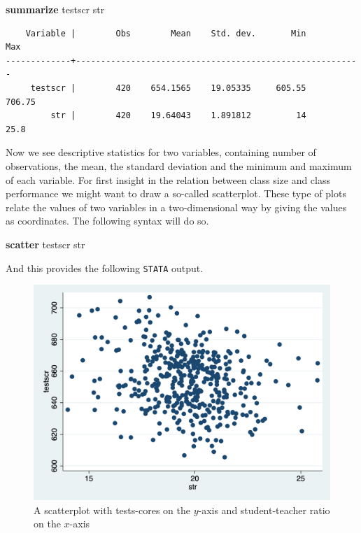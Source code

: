 \documentclass[
]{book}
\newenvironment{Shaded}{\begin{snugshade}}{\end{snugshade}}
\newcommand{\KeywordTok}[1]{\textcolor[rgb]{0.13,0.29,0.53}{\textbf{#1}}}
\newcommand{\NormalTok}[1]{#1}
\begin{document}
\begin{Shaded}
\begin{Highlighting}[]
\KeywordTok{summarize}\NormalTok{ testscr str}
\end{Highlighting}
\end{Shaded}

\begin{verbatim}
    Variable |        Obs        Mean    Std. dev.       Min        Max
-------------+---------------------------------------------------------
     testscr |        420    654.1565    19.05335     605.55     706.75
         str |        420    19.64043    1.891812         14       25.8
\end{verbatim}

Now we see descriptive statistics for two variables, containing number of observations, the mean, the standard deviation and the minimum and maximum of each variable. For first insight in the relation between class size and class performance we might want to draw a so-called scatterplot. These type of plots relate the values of two variables in a two-dimensional way by giving the values as coordinates. The following syntax will do so.

\begin{Shaded}
\begin{Highlighting}[]
\KeywordTok{scatter}\NormalTok{ testscr str}
\end{Highlighting}
\end{Shaded}

And this provides the following \texttt{STATA} output.

\begin{figure}

{\centering \includegraphics[width=600px]{./figures/scatter} 

}

\caption{A scatterplot with tests-cores on the $y$-axis and student-teacher ratio on the $x$-axis}\label{fig:scattercaschool}
\end{figure}
\end{document}
